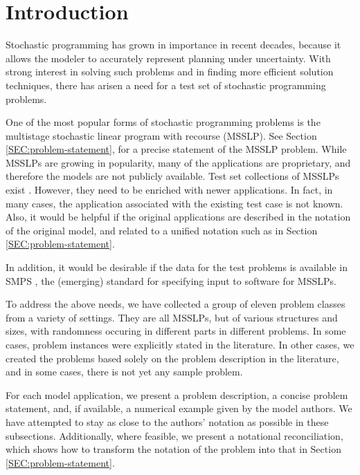 \section{Introduction}
Stochastic programming has grown in importance in recent decades,
because it allows the modeler to accurately represent planning under
uncertainty.
With strong interest in solving such problems and in
finding more efficient solution techniques,
there has arisen a need
for a test set of stochastic programming problems.

\par
One of the most popular forms of stochastic programming problems
is the multistage stochastic linear program with recourse
(MSSLP). See Section \ref{SEC:problem-statement}, for a
precise  statement of the MSSLP problem.
While MSSLPs are growing in popularity, many of the 
applications are proprietary, and therefore the models are not 
publicly available.  Test set collections of MSSLPs exist
\cite{gassmann89,postswebsite}.  However, they need 
to be enriched with newer applications.  In fact, 
in many cases, the application associated with the existing 
test case is not known.  Also, it would 
be helpful if the original applications are described in the 
notation of the original model, and related to a 
unified notation such as in 
Section \ref{SEC:problem-statement}.

In addition, it would be desirable if the data for the test
problems is available in SMPS \cite{SMPS87}, the (emerging)
standard for specifying input to software for MSSLPs.

To address the above needs, we have collected a 
group of eleven problem classes from a variety of settings.
They are all MSSLPs, but of various structures 
and sizes, with randomness occuring in different parts in different
problems.
In some cases, 
problem instances were explicitly stated in the literature.  In 
other cases, we created the problems based solely on 
the problem description in the literature, and in some 
cases, there is not yet any sample problem.  

For each model application, we present a problem description, a concise problem
statement, and, if available, a numerical example given by the model authors. 
We have attempted to stay as close to the authors' notation as possible in
these subsections.  Additionally, where feasible, we present a notational
reconciliation, which shows how to transform the notation of the problem into
that
in Section \ref{SEC:problem-statement}.


